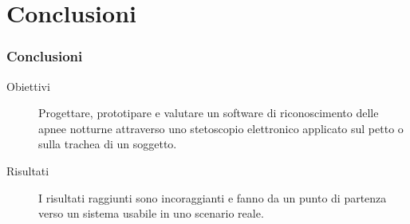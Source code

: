 \section{Conclusioni}
\begin{frame}
\frametitle{Conclusioni}


\begin{description}
  \item[Obiettivi]
    Progettare, prototipare e valutare un software di riconoscimento delle apnee notturne attraverso uno stetoscopio elettronico applicato sul petto o sulla trachea di un soggetto.
  \item[Risultati] 
    I risultati raggiunti sono incoraggianti e
    fanno da un punto di partenza verso un sistema usabile in uno scenario reale.    
\end{description}





\end{frame}